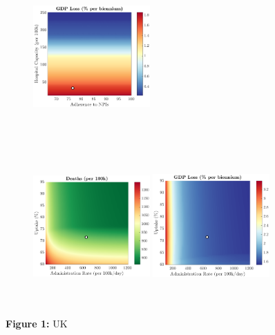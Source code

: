 \documentclass[paper=a4, fontsize=11pt]{scrartcl}
\numberwithin{figure}{section}
\numberwithin{table}{section}
\begin{document}
\begin{figure}[H]
\begin{subfigure}[b]{\textwidth}
	\hspace{0.05cm}
    	\includegraphics[width=0.49\textwidth,height=6cm]{UK/COVID/npl_g}
    \end{subfigure}
    \begin{subfigure}[b]{\textwidth}
      	\includegraphics[width=0.49\textwidth,height=6cm]{UK/COVID/imm_d}
	\hspace{0.05cm}
    	\includegraphics[width=0.49\textwidth,height=6cm]{UK/COVID/imm_g}
    \end{subfigure}
\caption*{\textbf{Figure 1:} UK} 
\end{figure}
\end{document}
